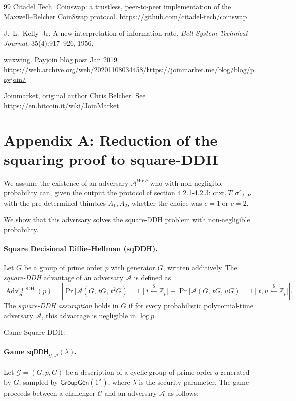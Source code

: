 \documentclass[11pt]{article}
\begin{document}
\begin{thebibliography}{99}
 Citadel Tech. Coinswap: a trustless, peer-to-peer implementation of the Maxwell--Belcher CoinSwap protocol. \url{https://github.com/citadel-tech/coinswap}

 J.~L.~Kelly~Jr. A new interpretation of information rate. \emph{Bell System Technical Journal}, 35(4):917--926, 1956.

 waxwing. Payjoin blog post Jan 2019 \url{https://web.archive.org/web/20201108034458/https://joinmarket.me/blog/blog/payjoin/}

 Joinmarket, original author Chris Belcher. See \url{https://en.bitcoin.it/wiki/JoinMarket}

\end{thebibliography}

\newpage

\section{Appendix A: Reduction of the squaring proof to square-DDH}

We assume the existence of an adversary $\mathcal{A}^{WFP}$ who with non-negligible probability can, given the output the protocol of section 4.2.1-4.2.3: $\textrm{ctxt}, T, \sigma'_{A, P}$ with the pre-determined thimbles $A_1, A_2$, whether the choice was $c=1$ or $c=2$.

We show that this adversary solves the square-DDH problem with non-negligible probability.

\paragraph{Square Decisional Diffie--Hellman (sqDDH).}
Let $G$ be a group of prime order $p$ with generator $G$, written
additively. The \emph{square-DDH} advantage of an adversary $\mathcal{A}$
is defined as
$$
\operatorname{Adv}^{\mathrm{sqDDH}}_{\mathcal{A}}(p)
=
\left|
\Pr\!\big[\mathcal{A}(G,\, tG,\, t^{2}G)=1 \;\big|\; t \xleftarrow{\$} \mathbb{Z}_{p}\big]
-
\Pr\!\big[\mathcal{A}(G,\, tG,\, uG)=1 \;\big|\; t,u \xleftarrow{\$} \mathbb{Z}_{p}\big]
\right|.
$$
The \emph{square-DDH assumption} holds in $G$ if for every probabilistic
polynomial-time adversary $\mathcal{A}$, this advantage is negligible in
$\log p$.

Game Square-DDH:

\paragraph{Game $\mathsf{sqDDH}_{\mathcal{G}, \mathcal{A}}(\lambda)$.}
Let $\mathcal{G} = (G, p, G)$ be a description of a cyclic group of prime
order $q$ generated by $G$, sampled by
$\mathsf{GroupGen}(1^{\lambda})$, where $\lambda$ is the security
parameter. The game proceeds between a challenger $\mathcal{C}$ and an
adversary $\mathcal{A}$ as follows:
\end{document}
